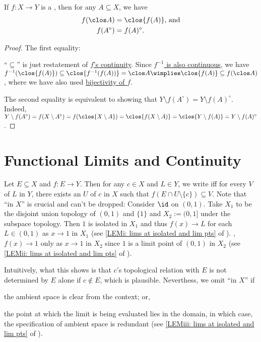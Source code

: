 	\begin{lem}\label{LEM: homeo img of clos and int}
		If $f\colon X\to Y$ is a \homeo, then for any $A\subseteq X$, we have
		\begin{align*}
			f(\clos A) & = \clos{f(A)}\text{, and}\\
			f(A^\circ) & = f(A)^\circ\text.
		\end{align*}
	\end{lem}
	
	\begin{proof}
		The first equality:
		\begin{subproof}
			``$\subseteq$'' is just restatement of \uline{$f$'s continuity}. Since \uline{$f^{-1}$ is also continuous}, we have $f^{-1}(\clos{f(A)})\subseteq \clos{f^{-1}(f(A))} = \clos A\wimplies \clos{f(A)}\subseteq f(\clos A)$, where we have also used \uline{bijectivity of $f$}.
		\end{subproof}
		
		The second equality is equivalent to showing that $Y\setminus f(A^\circ) = Y\setminus f(A)^\circ$. Indeed, $Y\setminus f(A^\circ) = f(X\setminus A^\circ) = f(\clos{X\setminus A}) = \clos{f(X\setminus A)} = \clos{Y\setminus f(A)} = Y\setminus f(A)^\circ$.
	\end{proof}
	



\section{Functional Limits and Continuity}

	Let $E\subseteq X$ and $f\colon E\to Y$. Then for any $c\in X$ and $L\in Y$, we write  iff for every \onbd $V$ of $L$ in $Y$, there exists an \onbd $U$ of $c$ in $X$ such that $f(E\cap U\setminus\{c\})\subseteq V$. Note that ``in $X$'' is crucial and can't be dropped: Consider $\id$ on $(0, 1)$. Take $X_1$ to be the disjoint union topology of $(0, 1)$ and $\{1\}$ and $X_2 := (0, 1]$ under the subspace topology. Then $1$ is isolated in $X_1$ and thus $f(x)\to L$ for each $L\in (0, 1)$ as $x\to 1$ in $X_1$ (see \ref{LEMi: lims at isolated and lim pts} of ). \Otoh, $f(x)\to 1$ only as $x\to 1$ in $X_2$ since $1$ is a limit point of $(0, 1)$ in $X_2$ (see \ref{LEMii: lims at isolated and lim pts} of ).
	
	Intuitively, what this shows is that $c$'s topological relation with $E$ is not determined by $E$ alone if $c\notin E$, which is plausible. Neverthess, we omit ``in $X$'' if 
	\begin{rmklist}
		\item the ambient space is clear from the context; or,
		\item the point at which the limit is being evaluated lies in the domain, in which case, the specification of ambient space is redundant (see \ref{LEMiii: lims at isolated and lim pts} of ).
	\end{rmklist}
	
